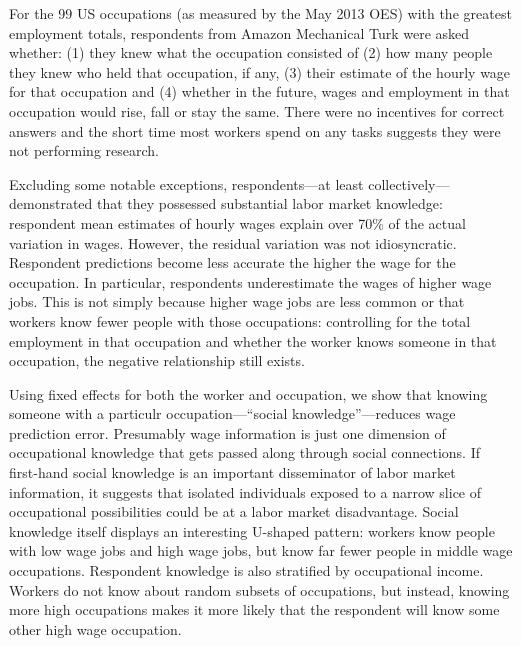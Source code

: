 \documentclass[11pt]{article}
\begin{document}
For the 99 US occupations (as measured by the May 2013 OES) with the greatest employment totals, respondents from Amazon Mechanical Turk were asked whether: 
(1) they knew what the occupation consisted of 
(2) how many people they knew who held that occupation, if any,  
(3) their estimate of the hourly wage for that occupation
and (4) whether in the future, wages and employment in that occupation would rise, fall or stay the same. 
There were no incentives for correct answers and the short time most workers spend on any tasks suggests they were not performing research. 

Excluding some notable exceptions, respondents---at least collectively---demonstrated that they possessed substantial labor market knowledge: 
respondent mean estimates of hourly wages explain over 70\% of the actual variation in wages.
However, the residual variation was not idiosyncratic.  
Respondent predictions become less accurate the higher the wage for the occupation.
In particular, respondents underestimate the wages of higher wage jobs. 
This is not simply because higher wage jobs are less common or that workers know fewer people with those occupations: 
controlling for the total employment in that occupation and whether the worker knows someone in that occupation, the negative relationship still exists. 

Using fixed effects for both the worker and occupation, we show that knowing someone with a particulr occupation---``social knowledge''---reduces wage prediction error. 
Presumably wage information is just one dimension of occupational knowledge that gets passed along through social connections. 
If first-hand social knowledge is an important disseminator of labor market information, it suggests that isolated individuals exposed to a narrow slice of occupational possibilities could be at a labor market disadvantage. 
Social knowledge itself displays an interesting U-shaped pattern: 
workers know people with low wage jobs and high wage jobs, but know far fewer people in middle wage occupations. 
Respondent knowledge is also stratified by occupational income. 
Workers do not know about random subsets of occupations, but instead, knowing more high occupations makes it more likely that the respondent will know some other high wage occupation. 
\end{document}
